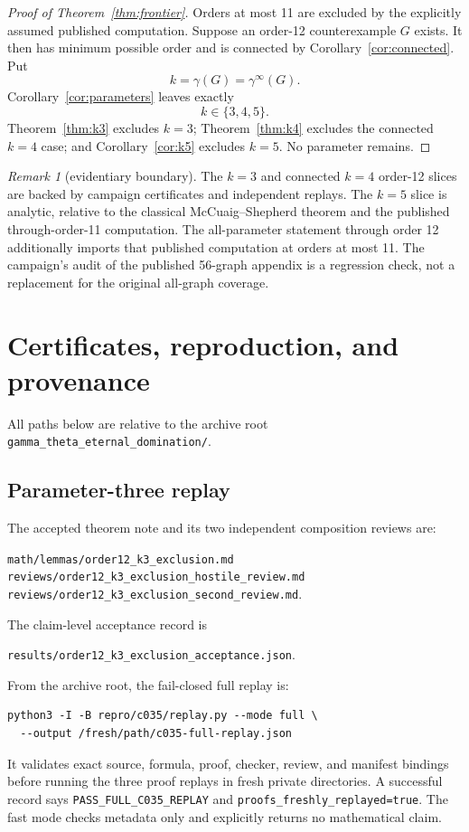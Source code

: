 \documentclass[11pt]{article}
\theoremstyle{definition}
\theoremstyle{remark}
\newtheorem{remark}[theorem]{Remark}
\newcommand{\gaminf}{\gamma^{\infty}}
\begin{document}
\begin{proof}[Proof of Theorem~\ref{thm:frontier}]
Orders at most 11 are excluded by the explicitly assumed published
computation.  Suppose an order-12 counterexample \(G\) exists.  It then has
minimum possible order and is connected by
Corollary~\ref{cor:connected}.  Put
\[
  k=\gamma(G)=\gaminf(G).
\]
Corollary~\ref{cor:parameters} leaves exactly
\[
  k\in\{3,4,5\}.
\]
Theorem~\ref{thm:k3} excludes \(k=3\);
Theorem~\ref{thm:k4} excludes the connected \(k=4\) case; and
Corollary~\ref{cor:k5} excludes \(k=5\).  No parameter remains.
\end{proof}

\begin{remark}[evidentiary boundary]
The \(k=3\) and connected \(k=4\) order-12 slices are backed by campaign
certificates and independent replays.  The \(k=5\) slice is analytic,
relative to the classical McCuaig--Shepherd theorem and the published
through-order-11 computation.  The all-parameter statement through order
12 additionally imports that published computation at orders at most 11.
The campaign's audit of the published 56-graph appendix is a regression
check, not a replacement for the original all-graph coverage.
\end{remark}

\section{Certificates, reproduction, and provenance}\label{sec:repro}

All paths below are relative to the archive root
\texttt{gamma\_theta\_eternal\_domination/}.

\subsection{Parameter-three replay}

The accepted theorem note and its two independent composition reviews are:
\begin{center}
\begin{minipage}{0.95\linewidth}
\texttt{math/lemmas/order12\_k3\_exclusion.md}\\
\texttt{reviews/order12\_k3\_exclusion\_hostile\_review.md}\\
\texttt{reviews/order12\_k3\_exclusion\_second\_review.md}.
\end{minipage}
\end{center}
The claim-level acceptance record is
\begin{center}
\texttt{results/order12\_k3\_exclusion\_acceptance.json}.
\end{center}
From the archive root, the fail-closed full replay is:
\begin{verbatim}
python3 -I -B repro/c035/replay.py --mode full \
  --output /fresh/path/c035-full-replay.json
\end{verbatim}
It validates exact source, formula, proof, checker, review, and manifest
bindings before running the three proof replays in fresh private
directories.  A successful record says
\texttt{PASS\_FULL\_C035\_REPLAY} and
\texttt{proofs\_freshly\_replayed=true}.  The fast mode checks metadata
only and explicitly returns no mathematical claim.
\end{document}
